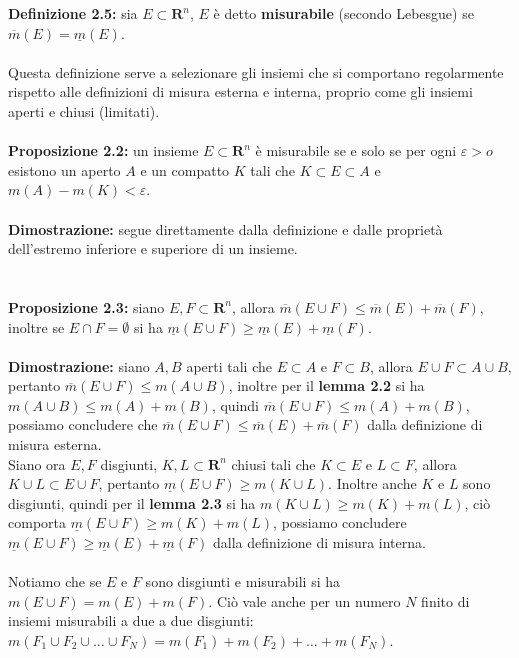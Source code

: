 \documentclass{article}
\begin{document}
\textbf{Definizione 2.5:} sia $E \subset \mathbf{R}^n$, $E$ è detto \textbf{misurabile} (secondo Lebesgue) se $\overline{m}(E) = \underline{m}(E)$. \\ \\
Questa definizione serve a selezionare gli insiemi che si comportano regolarmente rispetto alle definizioni di misura esterna e interna, proprio come gli insiemi aperti e chiusi (limitati). \\ \\
\textbf{Proposizione 2.2:} un insieme $E \subset \mathbf{R}^n$ è misurabile se e solo se per ogni $\varepsilon > o$ esistono un aperto $A$ e un compatto $K$ tali che $K \subset E \subset A$ e $m(A) - m(K) < \varepsilon$. \\ \\
\textbf{Dimostrazione:} segue direttamente dalla definizione e dalle proprietà dell'estremo inferiore e superiore di un insieme. \\ \\ \\
\textbf{Proposizione 2.3:} siano $E, F \subset \mathbf{R}^n$, allora $\overline{m}(E \cup F) \leq \overline{m}(E) + \overline{m}(F)$, inoltre se $E \cap F = \emptyset$ si ha $\underline{m}(E \cup F) \geq \underline{m}(E) + \underline{m}(F)$. \\ \\
\textbf{Dimostrazione:} siano $A, B$ aperti tali che $E \subset A$ e $F \subset B$, allora $E \cup F \subset A \cup B$, pertanto $\overline{m}(E \cup F) \leq m(A \cup B)$, inoltre per il \textbf{lemma 2.2} si ha $m(A \cup B) \leq m(A) + m(B)$, quindi $\overline{m}(E \cup F) \leq m(A) + m(B)$, possiamo concludere che $\overline{m}(E \cup F) \leq \overline{m}(E) + \overline{m}(F)$ dalla definizione di misura esterna. \\
Siano ora $E, F$ disgiunti, $K, L \subset \mathbf{R}^n$ chiusi tali che $K \subset E$ e $L \subset F$, allora $K \cup L \subset E \cup F$, pertanto $\underline{m}(E \cup F) \geq m(K \cup L)$. Inoltre anche $K$ e $L$ sono disgiunti, quindi per il \textbf{lemma 2.3} si ha $m(K \cup L) \geq m(K) + m(L)$, ciò comporta $\underline{m}(E \cup F) \geq m(K) + m(L)$, possiamo concludere $\underline{m}(E \cup F) \geq \underline{m}(E) + \underline{m}(F)$ dalla definizione di misura interna. \\ \\
Notiamo che se $E$ e $F$ sono disgiunti e misurabili si ha $m(E \cup F) = m(E) + m(F)$. Ciò vale anche per un numero $N$ finito di insiemi misurabili a due a due disgiunti: $m(F_1 \cup F_2 \cup \dots \cup F_N) = m(F_1) + m(F_2) + \dots + m(F_N)$. \\ \\ \\
\end{document}

